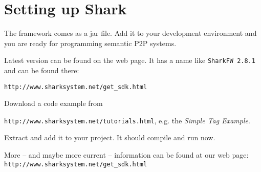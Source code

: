 \chapter{Setting up Shark}
The framework comes as a jar file. Add it to your development environment and you are ready for programming semantic P2P systems. 

Latest version can be found on the web page. It has a name like
{\verb|SharkFW 2.8.1|} and can be found there:

{\verb|http://www.sharksystem.net/get_sdk.html|}

Download a code example from 

{\verb|http://www.sharksystem.net/tutorials.html|}, e.g.
the {\it Simple Tag Example}.

Extract and add it to your project. It should compile and run now.

More -- and maybe more current -- information can be found at our web page:
{\tt http://www.sharksystem.net/get\_sdk.html} 
